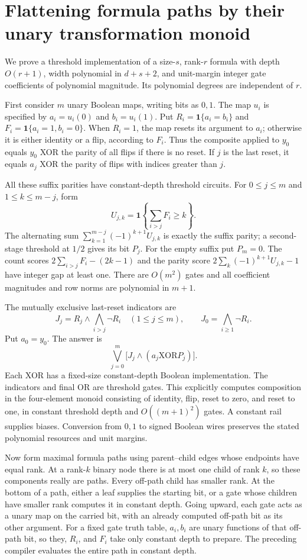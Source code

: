 \documentclass[11pt]{article}
\theoremstyle{remark}\newtheorem{remark}[theorem]{Remark}
\begin{document}
\section{Flattening formula paths by their unary transformation monoid}
We prove a threshold implementation of a size-$s$, rank-$r$ formula
with depth $O(r+1)$, width polynomial in $d+s+2$, and unit-margin
integer gate coefficients of polynomial magnitude. Its polynomial
degrees are independent of $r$.

First consider $m$ unary Boolean maps, writing bits as $0,1$.
The map $u_i$ is specified by $a_i=u_i(0)$ and $b_i=u_i(1)$.
Put $R_i=\boldsymbol1\{a_i=b_i\}$ and
$F_i=\boldsymbol1\{a_i=1,b_i=0\}$. When $R_i=1$, the map
resets its argument to $a_i$; otherwise it is either identity
or a flip, according to $F_i$. Thus the composite applied to
$y_0$ equals $y_0$ XOR the parity of all flips if there is no
reset. If $j$ is the last reset, it equals $a_j$ XOR the
parity of flips with indices greater than $j$.

All these suffix parities have constant-depth threshold circuits.
For $0\le j\le m$ and $1\le k\le m-j$, form
\[
 U_{j,k}=\boldsymbol1\left\{\sum_{i>j}F_i\ge k\right\}.
\]
The alternating sum
$\sum_{k=1}^{m-j}(-1)^{k+1}U_{j,k}$ is exactly the suffix
parity; a second-stage threshold at $1/2$ gives its bit $P_j$.
For the empty suffix put $P_m=0$.
The count scores $2\sum_{i>j}F_i-(2k-1)$ and the parity score
$2\sum_k(-1)^{k+1}U_{j,k}-1$ have integer gap at least one.
There are $O(m^2)$ gates and all coefficient magnitudes and row
norms are polynomial in $m+1$.

The mutually exclusive last-reset indicators are
\[
 J_j=R_j\wedge\bigwedge_{i>j}\neg R_i\quad(1\le j\le m),
 \qquad J_0=\bigwedge_{i\ge1}\neg R_i.
\]
Put $a_0=y_0$. The answer is
\[
 \bigvee_{j=0}^m\bigl[J_j\wedge(a_j\mathbin{\mathrm{XOR}}P_j)\bigr].
\]
Each XOR has a fixed-size constant-depth Boolean implementation.
The indicators and final OR are threshold gates. This explicitly
computes composition in the four-element monoid consisting of
identity, flip, reset to zero, and reset to one, in constant
threshold depth and $O((m+1)^2)$ gates. A constant rail supplies
biases. Conversion from $0,1$ to signed Boolean wires preserves
the stated polynomial resources and unit margins.

Now form maximal formula paths using parent--child edges whose
endpoints have equal rank. At a rank-$k$ binary node there is at
most one child of rank $k$, so these components really are paths.
Every off-path child has smaller rank. At the bottom of a path,
either a leaf supplies the starting bit, or a gate whose children
have smaller rank computes it in constant depth. Going upward,
each gate acts as a unary map on the carried bit, with an already
computed off-path bit as its other argument. For a fixed gate
truth table, $a_i,b_i$ are unary functions of that off-path bit,
so they, $R_i$, and $F_i$ take only constant depth to prepare.
The preceding compiler evaluates the entire path in constant depth.
\end{document}
